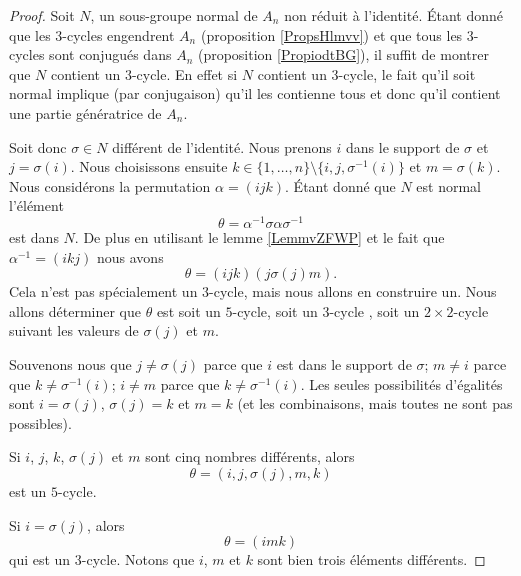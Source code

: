 \begin{proof}
    Soit \( N\), un sous-groupe normal de \( A_n\) non réduit à l'identité. Étant donné que les \( 3\)-cycles engendrent \( A_n\) (proposition \ref{PropsHlmvv}) et que tous les \( 3\)-cycles sont conjugués dans \( A_n\) (proposition \ref{PropiodtBG}), il suffit de montrer que \( N\) contient un \( 3\)-cycle. En effet si \( N\) contient un \( 3\)-cycle, le fait qu'il soit normal implique (par conjugaison) qu'il les contienne tous et donc qu'il contient une partie génératrice de \( A_n\).

    Soit donc \( \sigma\in N\) différent de l'identité. Nous prenons \( i\) dans le support de \( \sigma\) et \( j=\sigma(i)\). Nous choisissons ensuite \( k\in\{ 1,\ldots, n \}\setminus\{ i,j,\sigma^{-1}(i) \}\) et \( m=\sigma(k)\). Nous considérons la permutation \( \alpha=(ijk)\). Étant donné que \( N\) est normal l'élément
    \begin{equation}
        \theta=\alpha^{-1}\sigma\alpha\sigma^{-1}
    \end{equation}
    est dans \( N\). De plus en utilisant le lemme \ref{LemmvZFWP} et le fait que \( \alpha^{-1}=(ikj)\) nous avons
    \begin{equation}
        \theta=(ijk)(j\sigma(j)m).
    \end{equation}
    Cela n'est pas spécialement un \( 3\)-cycle, mais nous allons en construire un. Nous allons déterminer que \( \theta\) est soit un \( 5\)-cycle, soit un \( 3\)-cycle , soit un \( 2\times 2\)-cycle suivant les valeurs de \( \sigma(j)\) et \( m\). 

    Souvenons nous que \( j\neq\sigma(j)\) parce que \( i\) est dans le support de \( \sigma\); \( m\neq i\) parce que \( k\neq \sigma^{-1}(i)\); \( i\neq m\) parce que \( k\neq \sigma^{-1}(i)\). Les seules possibilités d'égalités sont \( i=\sigma(j)\), \( \sigma(j)=k\) et \( m=k\) (et les combinaisons, mais toutes ne sont pas possibles).
    
    Si \( i\), \( j\), \( k\), \( \sigma(j)\) et \( m\) sont cinq nombres différents, alors 
    \begin{equation}
        \theta=(i,j,\sigma(j),m,k)
    \end{equation}
    est un \( 5\)-cycle.

    Si \( i=\sigma(j)\), alors
    \begin{equation}
        \theta=(imk)
    \end{equation}
    qui est un \( 3\)-cycle. Notons que \( i\), \( m\) et \( k\) sont bien trois éléments différents.


\end{proof}
